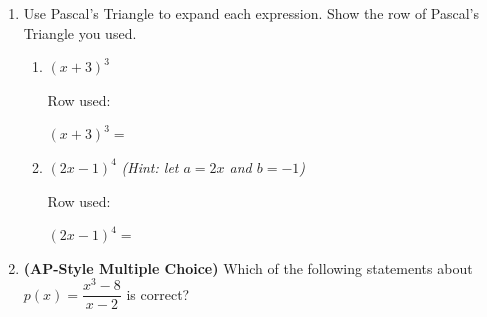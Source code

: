 \documentclass[10pt]{article}
\begin{document}
\begin{enumerate}[itemsep=18pt]
      \begin{enumerate}[label=(\alph*), itemsep=8pt]
        \item Perform polynomial long division.

              \vspace{0.06in}
              $R(x) = $ 

        \item State the equation of the slant asymptote. Explain in one sentence why this is
              the slant asymptote.

              \vspace{0.06in}
              Slant asymptote: $y = $ 


        \item What is the remainder when $x^2+x-6$ is divided by $x-1$? What does this tell
              you about $R(1)$?

              \vspace{0.06in}
              Remainder:  \quad $R(1) = $ 
      \end{enumerate}

\item Use Pascal's Triangle to expand each expression. Show the row of Pascal's Triangle you used.

      \begin{enumerate}[label=(\alph*), itemsep=10pt]
        \item $(x + 3)^3$

              \vspace{0.06in}
              Row used: 

              $(x+3)^3 = $ 

        \item $(2x - 1)^4$ \quad \textit{(Hint: let $a = 2x$ and $b = -1$)}

              \vspace{0.06in}
              Row used: 

              $(2x-1)^4 = $ 
      \end{enumerate}

\item \textbf{(AP-Style Multiple Choice)} Which of the following statements about
      $\displaystyle p(x) = \dfrac{x^3 - 8}{x - 2}$ is correct?


\end{enumerate}
\end{document}
